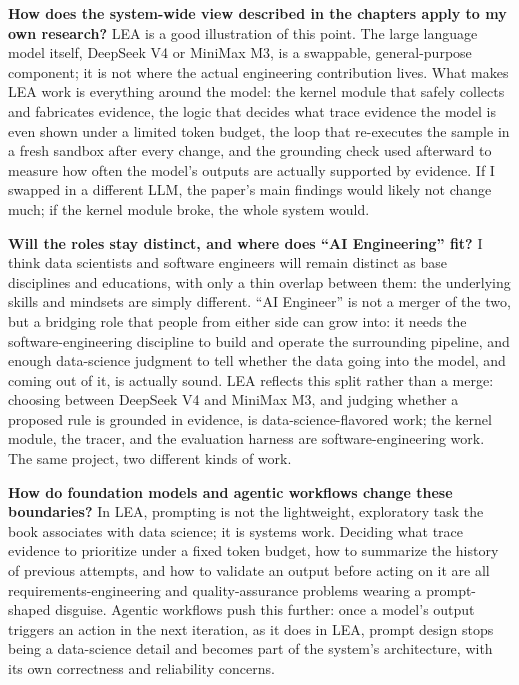 \documentclass[11pt,a4paper]{article}
\begin{document}
\textbf{How does the system-wide view described in the chapters apply to my own research?}
LEA is a good illustration of this point.
The large language model itself, DeepSeek V4 or MiniMax M3, is a swappable, general-purpose component; it is not where the actual engineering contribution lives.
What makes LEA work is everything around the model: the kernel module that safely collects and fabricates evidence, the logic that decides what trace evidence the model is even shown under a limited token budget, the loop that re-executes the sample in a fresh sandbox after every change, and the grounding check used afterward to measure how often the model's outputs are actually supported by evidence.
If I swapped in a different LLM, the paper's main findings would likely not change much; if the kernel module broke, the whole system would.

\textbf{Will the roles stay distinct, and where does ``AI Engineering'' fit?}
I think data scientists and software engineers will remain distinct as base disciplines and educations, with only a thin overlap between them: the underlying skills and mindsets are simply different.
``AI Engineer'' is not a merger of the two, but a bridging role that people from either side can grow into: it needs the software-engineering discipline to build and operate the surrounding pipeline, and enough data-science judgment to tell whether the data going into the model, and coming out of it, is actually sound.
LEA reflects this split rather than a merge: choosing between DeepSeek V4 and MiniMax M3, and judging whether a proposed rule is grounded in evidence, is data-science-flavored work; the kernel module, the tracer, and the evaluation harness are software-engineering work.
The same project, two different kinds of work.

\textbf{How do foundation models and agentic workflows change these boundaries?}
In LEA, prompting is not the lightweight, exploratory task the book associates with data science; it is systems work.
Deciding what trace evidence to prioritize under a fixed token budget, how to summarize the history of previous attempts, and how to validate an output before acting on it are all requirements-engineering and quality-assurance problems wearing a prompt-shaped disguise.
Agentic workflows push this further: once a model's output triggers an action in the next iteration, as it does in LEA, prompt design stops being a data-science detail and becomes part of the system's architecture, with its own correctness and reliability concerns.
\end{document}
